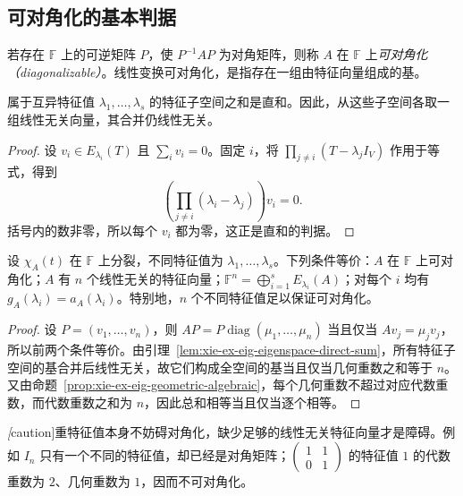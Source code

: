 \subsection{可对角化的基本判据}

\begin{definition}
若存在 $\mathbb F$ 上的可逆矩阵 $P$，使 $P^{-1}AP$ 为对角矩阵，则称 $A$ 在 $\mathbb F$ 上\emph{可对角化（diagonalizable）}。线性变换可对角化，是指存在一组由特征向量组成的基。
\end{definition}

\begin{lemma}
\label{lem:xie-ex-eig-eigenspace-direct-sum}
属于互异特征值 $\lambda_1,\ldots,\lambda_s$ 的特征子空间之和是直和。因此，从这些子空间各取一组线性无关向量，其合并仍线性无关。
\end{lemma}
\begin{proof}
设 $v_i\in E_{\lambda_i}(T)$ 且 $\sum_i v_i=0$。固定 $i$，将 $\prod_{j\ne i}(T-\lambda_jI_V)$ 作用于等式，得到
\[
\left(\prod_{j\ne i}(\lambda_i-\lambda_j)\right)v_i=0.
\]
括号内的数非零，所以每个 $v_i$ 都为零，这正是直和的判据。
\end{proof}

\begin{theorem}
\label{thm:xie-ex-eig-diagonalization-basic}
设 $\chi_A(t)$ 在 $\mathbb F$ 上分裂，不同特征值为 $\lambda_1,\ldots,\lambda_s$。下列条件等价：$A$ 在 $\mathbb F$ 上可对角化；$A$ 有 $n$ 个线性无关的特征向量；$\mathbb F^n=\bigoplus_{i=1}^sE_{\lambda_i}(A)$；对每个 $i$ 均有 $g_A(\lambda_i)=a_A(\lambda_i)$。特别地，$n$ 个不同特征值足以保证可对角化。
\end{theorem}
\begin{proof}
设 $P=(v_1,\ldots,v_n)$，则 $AP=P\operatorname{diag}(\mu_1,\ldots,\mu_n)$ 当且仅当 $Av_j=\mu_jv_j$，所以前两个条件等价。由引理~\ref{lem:xie-ex-eig-eigenspace-direct-sum}，所有特征子空间的基合并后线性无关，故它们构成全空间的基当且仅当几何重数之和等于 $n$。又由命题~\ref{prop:xie-ex-eig-geometric-algebraic}，每个几何重数不超过对应代数重数，而代数重数之和为 $n$，因此总和相等当且仅当逐个相等。
\end{proof}

\emph[caution]{重特征值本身不妨碍对角化，缺少足够的线性无关特征向量才是障碍。}例如 $I_n$ 只有一个不同的特征值，却已经是对角矩阵；$\begin{pmatrix}1&1\\0&1\end{pmatrix}$ 的特征值 $1$ 的代数重数为 $2$、几何重数为 $1$，因而不可对角化。

